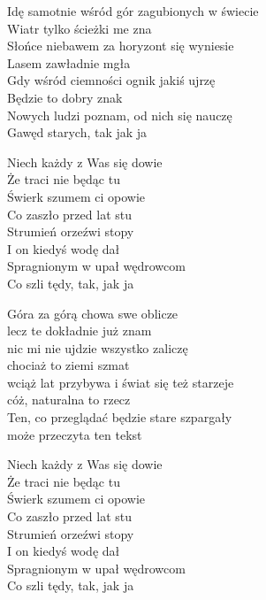 \begin{text}
    Idę samotnie wśród gór zagubionych w świecie\\
    Wiatr tylko ścieżki me zna\\
    Słońce niebawem za horyzont się wyniesie\\
    Lasem zawładnie mgła\\
    Gdy wśród ciemności ognik jakiś ujrzę\\
    Będzie to dobry znak\\
    Nowych ludzi poznam, od nich się nauczę\\
    Gawęd starych, tak jak ja

    \vin Niech każdy z Was się dowie\\
    \vin Że traci nie będąc tu\\
    \vin Świerk szumem ci opowie\\
    \vin Co zaszło przed lat stu\\
    \vin Strumień orzeźwi stopy\\
    \vin I on kiedyś wodę dał\\
    \vin Spragnionym w upał wędrowcom\\
    \vin Co szli tędy, tak, jak ja

    Góra za górą chowa swe oblicze\\
    lecz te dokładnie już znam\\
    nic mi nie ujdzie wszystko zaliczę\\
    chociaż to ziemi szmat\\
    wciąż lat przybywa i świat się też starzeje\\
    cóż, naturalna to rzecz\\
    Ten, co przeglądać będzie stare szpargały\\
    może przeczyta ten tekst

    \vin Niech każdy z Was się dowie\\
    \vin Że traci nie będąc tu\\
    \vin Świerk szumem ci opowie\\
    \vin Co zaszło przed lat stu\\
    \vin Strumień orzeźwi stopy\\
    \vin I on kiedyś wodę dał\\
    \vin Spragnionym w upał wędrowcom\\
    \vin Co szli tędy, tak, jak ja
\end{text}
